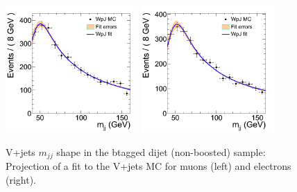 \begin{figure}
\begin{center}
\includegraphics[width=0.45\textwidth]{figs/wpj/DibosonBtaglnujj_WpJ_muon_2jets.png}
\includegraphics[width=0.45\textwidth]{figs/wpj/DibosonBtaglnujj_WpJ_electron_2jets.png}
\end{center}
\caption{\label{fig:WpJFit} V+jets $m_{jj}$ shape in the btagged dijet (non-boosted) sample:
Projection of a fit to the V+jets MC for muons (left) and electrons (right).}
\label{fig:WpJFit_Dijet_btag}
\end{figure}

